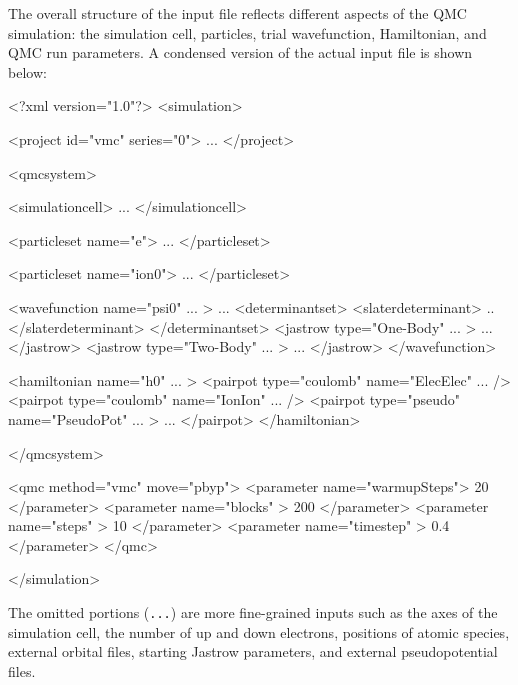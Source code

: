 The overall structure of the input file reflects different aspects of the QMC simulation: the simulation cell, particles, trial wavefunction, Hamiltonian, and QMC run parameters.  A condensed version of the actual input file is shown below:
\begin{shade}
<?xml version="1.0"?>
<simulation>

  <project id="vmc" series="0">
    ...
  </project>

  <qmcsystem>

    <simulationcell>
      ...
    </simulationcell>

    <particleset name="e">
      ...
    </particleset>

    <particleset name="ion0">
      ...
    </particleset>

    <wavefunction name="psi0" ... >
      ...
      <determinantset>
        <slaterdeterminant>
          ..
        </slaterdeterminant>
      </determinantset>
      <jastrow type="One-Body" ... >
         ...
      </jastrow>
      <jastrow type="Two-Body" ... >
        ...
      </jastrow>
    </wavefunction>

    <hamiltonian name="h0" ... >
      <pairpot type="coulomb" name="ElecElec" ... />
      <pairpot type="coulomb" name="IonIon"   ... />
      <pairpot type="pseudo" name="PseudoPot" ... >
        ...
      </pairpot>
    </hamiltonian>

   </qmcsystem>

   <qmc method="vmc" move="pbyp">
     <parameter name="warmupSteps">   20 </parameter>
     <parameter name="blocks"     >  200 </parameter>
     <parameter name="steps"      >   10 </parameter>
     <parameter name="timestep"   >  0.4 </parameter>
   </qmc>

</simulation>
\end{shade}
The omitted portions (\texttt{...}) are more fine-grained inputs such as the axes of the simulation cell, the number of up and down electrons, positions of atomic species, external orbital files, starting Jastrow parameters, and external pseudopotential files.  

